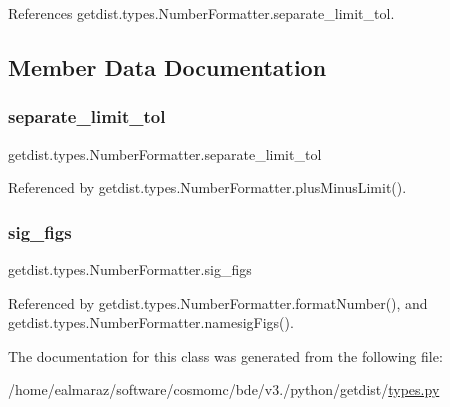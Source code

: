References getdist.\+types.\+Number\+Formatter.\+separate\+\_\+limit\+\_\+tol.



\subsection{Member Data Documentation}
\mbox{\label{classgetdist_1_1types_1_1NumberFormatter_adcfc154de32afddda5f3e3096691ba65}} 
\subsubsection{\texorpdfstring{separate\+\_\+limit\+\_\+tol}{separate\_limit\_tol}}
{\footnotesize\ttfamily getdist.\+types.\+Number\+Formatter.\+separate\+\_\+limit\+\_\+tol}



Referenced by getdist.\+types.\+Number\+Formatter.\+plus\+Minus\+Limit().

\mbox{\label{classgetdist_1_1types_1_1NumberFormatter_a33a4a2a590cd4940208a5195e13ef6b2}} 
\subsubsection{\texorpdfstring{sig\+\_\+figs}{sig\_figs}}
{\footnotesize\ttfamily getdist.\+types.\+Number\+Formatter.\+sig\+\_\+figs}



Referenced by getdist.\+types.\+Number\+Formatter.\+format\+Number(), and getdist.\+types.\+Number\+Formatter.\+namesig\+Figs().



The documentation for this class was generated from the following file\+:\begin{DoxyCompactItemize}
\item 
/home/ealmaraz/software/cosmomc/bde/v3./python/getdist/\mbox{\hyperlink{types_8py}{types.\+py}}\end{DoxyCompactItemize}
